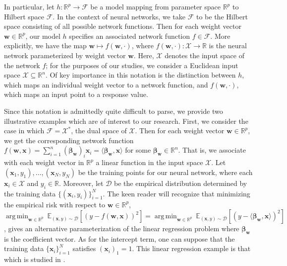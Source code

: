 \documentclass{article}
\DeclareMathOperator*{\argmin}{arg\,min}
\begin{document}
In particular, let $h: \mathbb{R}^p \rightarrow \mathcal{F}$ be a model mapping from parameter space $\mathbb{R}^p$ to Hilbert space $\mathcal{F}$. In the context of neural networks, we take $\mathcal{F}$ to be the Hilbert space consisting of all possible network functions. Then for each weight vector $\boldsymbol{w} \in \mathbb{R}^p$, our model $h$ specifies an associated network function $f \in \mathcal{F}$. More explicitly, we have the map $\boldsymbol{w} \mapsto f(\boldsymbol{w}, \cdot)$, where $f(\boldsymbol{w}, \cdot): \mathcal{X} \rightarrow \mathbb{R}$ is the neural network parameterized by weight vector $\boldsymbol{w}$. Here, $\mathcal{X}$ denotes the input space of the network $f$; for the purposes of our studies, we consider a Euclidean input space $\mathcal{X} \subseteq \mathbb{R}^n$. Of key importance in this notation is the distinction between $h$, which maps an individual weight vector to a network function, and $f(\boldsymbol{w}, \cdot)$, which maps an input point to a response value.

Since this notation is admittedly quite difficult to parse, we provide two illustrative examples which are of interest to our research. First, we consider the case in which $\mathcal{F} = \mathcal{X}^*$, the dual space of $\mathcal{X}$. Then for each weight vector $\boldsymbol{w} \in \mathbb{R}^p$, we get the corresponding network function $f(\boldsymbol{w}, \boldsymbol{x}) = \sum_{i=1}^n (\boldsymbol{\beta}_{\boldsymbol{w}})_i\boldsymbol{x}_i = \langle \boldsymbol{\beta}_{\boldsymbol{w}}, \boldsymbol{x} \rangle$ for some $\boldsymbol{\beta}_{\boldsymbol{w}} \in \mathbb{R}^n$. That is, we associate with each weight vector in $\mathbb{R}^p$ a linear function in the input space $\mathcal{X}$. Let $(\boldsymbol{x}_1, y_1), \ldots, (\boldsymbol{x}_N, y_N)$ be the training points for our neural network, where each $\boldsymbol{x}_i \in \mathcal{X}$ and $y_i \in \mathbb{R}$. Moreover, let $\mathcal{D}$ be the empirical distribution determined by the training data $\{(\boldsymbol{x}_i, y_i) \}_{i=1}^N$. The keen reader will recognize that minimizing the empirical risk with respect to $\boldsymbol{w} \in \mathbb{R}^p$, $\argmin_{\boldsymbol{w} \in \mathbb{R}^p} \  \mathbb{E}_{(\boldsymbol{x}, y) \sim \mathcal{D}}\left[\left(y - f(\boldsymbol{w}, \boldsymbol{x}) \right)^2 \right] = \argmin_{\boldsymbol{w} \in \mathbb{R}^p} \  \mathbb{E}_{(\boldsymbol{x}, y) \sim \mathcal{D}}\left[\left(y - \langle \boldsymbol{\beta}_{\boldsymbol{w}}, \boldsymbol{x} \rangle \right)^2 \right]$, gives an alternative parameterization of the linear regression problem where $\boldsymbol{\beta}_{\boldsymbol{w}}$ is the coefficient vector. As for the intercept term, one can suppose that the training data $\{ \boldsymbol{x}_i \}_{i=1}^N$ satisfies $(\boldsymbol{x}_i)_1 = 1$. This linear regression example is that which is studied in \cite{woodworth2020kernel}. 
\end{document}
